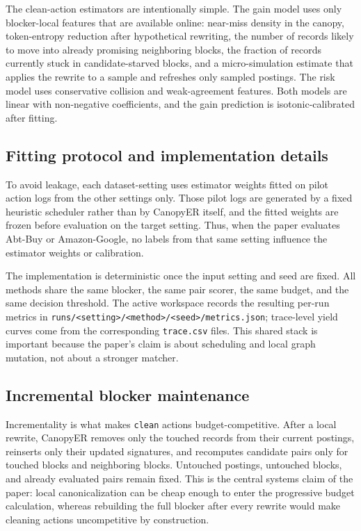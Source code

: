 \documentclass{article}
\newcommand{\method}{CanopyER}
\newcommand{\cleana}{\texttt{clean}}
\begin{document}
The clean-action estimators are intentionally simple. The gain model uses only blocker-local features that are available online: near-miss density in the canopy, token-entropy reduction after hypothetical rewriting, the number of records likely to move into already promising neighboring blocks, the fraction of records currently stuck in candidate-starved blocks, and a micro-simulation estimate that applies the rewrite to a sample and refreshes only sampled postings. The risk model uses conservative collision and weak-agreement features. Both models are linear with non-negative coefficients, and the gain prediction is isotonic-calibrated after fitting.

\subsection{Fitting protocol and implementation details}

To avoid leakage, each dataset-setting uses estimator weights fitted on pilot action logs from the other settings only. Those pilot logs are generated by a fixed heuristic scheduler rather than by \method{} itself, and the fitted weights are frozen before evaluation on the target setting. Thus, when the paper evaluates Abt-Buy or Amazon-Google, no labels from that same setting influence the estimator weights or calibration.

The implementation is deterministic once the input setting and seed are fixed. All methods share the same blocker, the same pair scorer, the same budget, and the same decision threshold. The active workspace records the resulting per-run metrics in \texttt{runs/<setting>/<method>/<seed>/metrics.json}; trace-level yield curves come from the corresponding \texttt{trace.csv} files. This shared stack is important because the paper's claim is about scheduling and local graph mutation, not about a stronger matcher.

\subsection{Incremental blocker maintenance}

Incrementality is what makes \cleana{} actions budget-competitive. After a local rewrite, \method{} removes only the touched records from their current postings, reinserts only their updated signatures, and recomputes candidate pairs only for touched blocks and neighboring blocks. Untouched postings, untouched blocks, and already evaluated pairs remain fixed. This is the central systems claim of the paper: local canonicalization can be cheap enough to enter the progressive budget calculation, whereas rebuilding the full blocker after every rewrite would make cleaning actions uncompetitive by construction.
\end{document}
